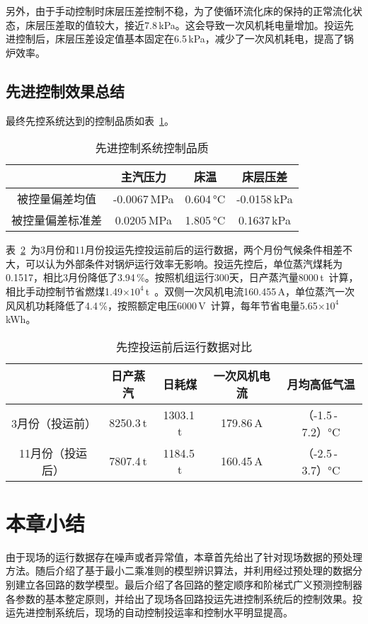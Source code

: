 另外，由于手动控制时床层压差控制不稳，为了使循环流化床的保持的正常流化状态，床层压差取的值较大，接近7.8$\,$\si{\kilo\pascal}。这会导致一次风机耗电量增加。投运先进控制后，床层压差设定值基本固定在6.5$\,$\si{\kilo\pascal}，减少了一次风机耗电，提高了锅炉效率。


\subsection{先进控制效果总结}

最终先控系统达到的控制品质如表~\ref{tab:performance}。
\begingroup
\renewcommand*{\arraystretch}{1.67}
\begin{table}[!h]
\small
\caption[先进控制系统控制品质]{先进控制系统控制品质} 
\label{tab:performance}
\centering
\begin{tabular}{cccc}
\hline\hline
     &主汽压力  &   床温  &   床层压差\\
\hline
被控量偏差均值 &  -0.0067$\,$\si{\mega\pascal} &  0.604$\,$\si{\degreeCelsius} & -0.0158$\,$\si{\kilo\pascal}\\
被控量偏差标准差 &0.0205$\,$\si{\mega\pascal} & 1.805$\,$\si{\degreeCelsius} & 0.1637$\,$\si{\kilo\pascal}\\
\hline\hline
\end{tabular}
\end{table}
\endgroup

表~\ref{tab:run_data}~为3月份和11月份投运先控投运前后的运行数据，两个月份气候条件相差不大，可以认为外部条件对锅炉运行效率无影响。投运先控后，单位蒸汽煤耗为0.1517，相比3月份降低了3.94$\,$\si{\percent}。按照机组运行300天，日产蒸汽量8000$\,$\si{\tonne}~计算，相比手动控制节省燃煤1.49$\times\textrm{10}^{\textrm{4}}\,$\si{\tonne}~。双侧一次风机电流160.455$\,$\si{\ampere}，单位蒸汽一次风风机功耗降低了4.4$\,$\si{\percent}，按照额定电压6000$\,$\si{\volt}~计算，每年节省电量5.65$\times\textrm{10}^{\textrm{4}}\,$\si{\kWh}。

\begingroup
\renewcommand*{\arraystretch}{1.67}
\begin{table}[!h]
\small
\caption[先控投运前后运行数据对比]{先控投运前后运行数据对比} 
\label{tab:run_data}
\centering
\begin{tabular}{ccccc}
\hline\hline
 	&日产蒸汽&日耗煤&一次风机电流&月均高低气温\\
\hline
3月份（投运前） & 8250.3$\,$\si{\tonne}&1303.1$\,$\si{\tonne}&179.86$\,$\si{\ampere}&（-1.5$\,$-$\,$7.2）\si{\degreeCelsius}\\
11月份（投运后）&7807.4$\,$\si{\tonne}&1184.5$\,$\si{\tonne}&160.45$\,$\si{\ampere}&（-2.5$\,$-$\,$3.7）\si{\degreeCelsius}\\
\hline\hline
\end{tabular}
\end{table}
\endgroup

\section{本章小结}
由于现场的运行数据存在噪声或者异常值，本章首先给出了针对现场数据的预处理方法。随后介绍了基于最小二乘准则的模型辨识算法，并利用经过预处理的数据分别建立各回路的数学模型。最后介绍了各回路的整定顺序和阶梯式广义预测控制器各参数的基本整定原则，并给出了现场各回路投运先进控制系统后的控制效果。投运先进控制系统后，现场的自动控制投运率和控制水平明显提高。